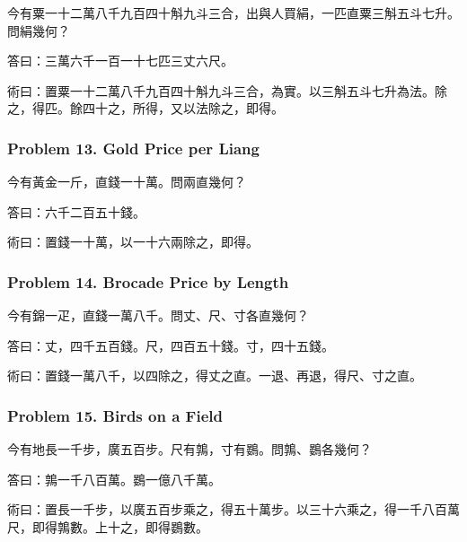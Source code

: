 \documentclass[11pt,a4paper]{article}
\newcommand{\zh}[1]{{\CJKfamily{}#1}}
\begin{document}
\begin{problembox}[title=\zh{問}]
\zh{今有粟一十二萬八千九百四十斛九斗三合，出與人買絹，一匹直粟三斛五斗七升。問絹幾何？}
\end{problembox}
\begin{answerbox}[title=\zh{答}]
\zh{答曰：三萬六千一百一十七匹三丈六尺。}
\end{answerbox}
\begin{methodbox}[title=\zh{術}]
\zh{術曰：置粟一十二萬八千九百四十斛九斗三合，為實。以三斛五斗七升為法。除之，得匹。餘四十之，所得，又以法除之，即得。}
\end{methodbox}

\subsubsection*{Problem 13. Gold Price per Liang}

\begin{problembox}[title=\zh{問}]
\zh{今有黃金一斤，直錢一十萬。問兩直幾何？}
\end{problembox}
\begin{answerbox}[title=\zh{答}]
\zh{答曰：六千二百五十錢。}
\end{answerbox}
\begin{methodbox}[title=\zh{術}]
\zh{術曰：置錢一十萬，以一十六兩除之，即得。}
\end{methodbox}

\subsubsection*{Problem 14. Brocade Price by Length}

\begin{problembox}[title=\zh{問}]
\zh{今有錦一疋，直錢一萬八千。問丈、尺、寸各直幾何？}
\end{problembox}
\begin{answerbox}[title=\zh{答}]
\zh{答曰：丈，四千五百錢。尺，四百五十錢。寸，四十五錢。}
\end{answerbox}
\begin{methodbox}[title=\zh{術}]
\zh{術曰：置錢一萬八千，以四除之，得丈之直。一退、再退，得尺、寸之直。}
\end{methodbox}

\subsubsection*{Problem 15. Birds on a Field}

\begin{problembox}[title=\zh{問}]
\zh{今有地長一千步，廣五百步。尺有鶉，寸有鷃。問鶉、鷃各幾何？}
\end{problembox}
\begin{answerbox}[title=\zh{答}]
\zh{答曰：鶉一千八百萬。鷃一億八千萬。}
\end{answerbox}
\begin{methodbox}[title=\zh{術}]
\zh{術曰：置長一千步，以廣五百步乘之，得五十萬步。以三十六乘之，得一千八百萬尺，即得鶉數。上十之，即得鷃數。}
\end{methodbox}
\end{document}
